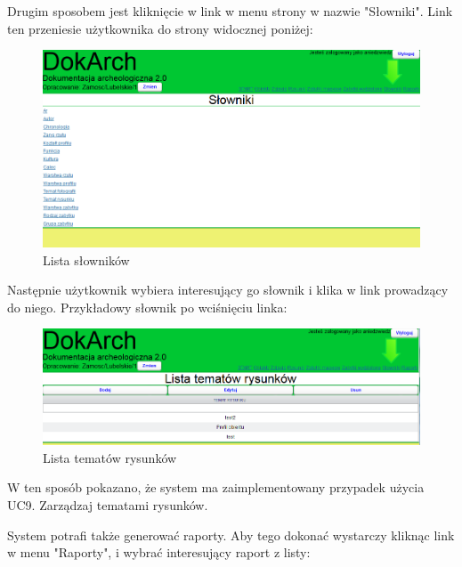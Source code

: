 Drugim sposobem jest kliknięcie w link w menu strony w nazwie "Słowniki". Link ten przeniesie użytkownika do strony widocznej poniżej:

\begin{figure} [H]
    \begin{center}
	\includegraphics[scale=.6]{img/listaSlownikow.png}
	\caption{Lista słowników}
	\label{listaSlownikow}
    \end{center}
\end{figure}
\newpage
Następnie użytkownik wybiera interesujący go słownik i klika w link prowadzący do niego. Przykładowy słownik po wciśnięciu linka:

\begin{figure} [H]
    \begin{center}
	\includegraphics[scale=.6]{img/listaTematowRysunkow.png}
	\caption{Lista tematów rysunków}
	\label{listaTematowRysunkow}
    \end{center}
\end{figure}

W ten sposób pokazano, że system ma zaimplementowany przypadek użycia UC9. Zarządzaj tematami rysunków.

System potrafi także generować raporty. Aby tego dokonać wystarczy kliknąc link w menu "Raporty", i wybrać interesujący raport z listy:

